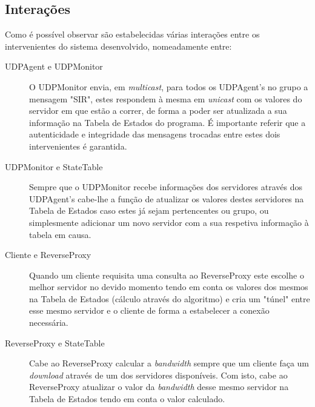 \documentclass{article}
\begin{document}
\subsection{Interações}
Como é possível observar são estabelecidas várias interações entre os intervenientes do sistema desenvolvido, nomeadamente entre:
\begin{description}
    \item [UDPAgent e UDPMonitor] O UDPMonitor envia, em \textit{multicast}, para todos os UDPAgent's no grupo a mensagem "SIR", estes respondem à mesma em \textit{unicast} com os valores do servidor em que estão a correr, de forma a poder ser atualizada a sua informação na Tabela de Estados do programa. É importante referir que a autenticidade e integridade das mensagens trocadas entre estes dois intervenientes é garantida.
    \item [UDPMonitor e StateTable] Sempre que o UDPMonitor recebe informações dos servidores através dos UDPAgent's cabe-lhe a função de atualizar os valores destes servidores na Tabela de Estados caso estes já sejam pertencentes ou grupo, ou simplesmente adicionar um novo servidor com a sua respetiva informação 
à tabela em causa.
    \item [Cliente e ReverseProxy] Quando um cliente requisita uma consulta ao ReverseProxy este escolhe o melhor servidor no devido momento tendo em conta os valores dos mesmos na Tabela de Estados (cálculo através do algoritmo) e cria um "túnel" entre esse mesmo servidor e o cliente de forma a estabelecer a conexão necessária.
    \item [ReverseProxy e StateTable] Cabe ao ReverseProxy calcular a \textit{bandwidth} sempre que um cliente faça um \textit{download} através de um dos servidores disponíveis. Com isto, cabe ao ReverseProxy atualizar o valor da \textit{bandwidth} desse mesmo servidor na Tabela de Estados tendo em conta o valor calculado.
\end{description}
\end{document}

